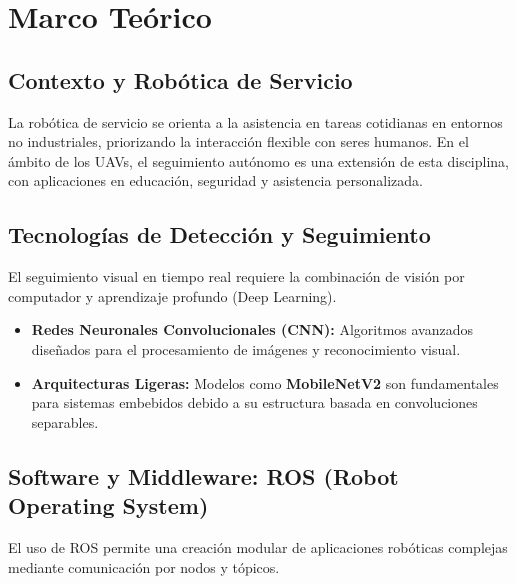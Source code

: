 \chapter{\label{marcoteorico}Marco Teórico}

\section{Contexto y Robótica de Servicio}
La robótica de servicio se orienta a la asistencia en tareas cotidianas en entornos no industriales, priorizando la interacción flexible con seres humanos. En el ámbito de los UAVs, el seguimiento autónomo es una extensión de esta disciplina, con aplicaciones en educación, seguridad y asistencia personalizada.

\section{Tecnologías de Detección y Seguimiento}
El seguimiento visual en tiempo real requiere la combinación de visión por computador y aprendizaje profundo (Deep Learning). 

\begin{itemize}
    \item \textbf{Redes Neuronales Convolucionales (CNN):} Algoritmos avanzados diseñados para el procesamiento de imágenes y reconocimiento visual.
    \item \textbf{Arquitecturas Ligeras:} Modelos como \textbf{MobileNetV2} son fundamentales para sistemas embebidos debido a su estructura basada en convoluciones separables.
\end{itemize}

\section{Software y Middleware: ROS (Robot Operating System)}
El uso de ROS permite una creación modular de aplicaciones robóticas complejas mediante comunicación por nodos y tópicos.
